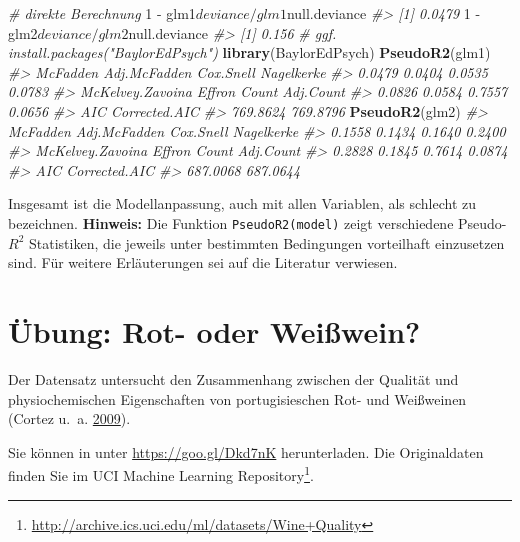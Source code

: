 \documentclass[12pt,ngerman,]{book}
\makeatletter
\newenvironment{Shaded}{\begin{snugshade}}{\end{snugshade}}
\newcommand{\KeywordTok}[1]{\textcolor[rgb]{0.13,0.29,0.53}{\textbf{{#1}}}}
\newcommand{\DecValTok}[1]{\textcolor[rgb]{0.00,0.00,0.81}{{#1}}}
\newcommand{\StringTok}[1]{\textcolor[rgb]{0.31,0.60,0.02}{{#1}}}
\newcommand{\CommentTok}[1]{\textcolor[rgb]{0.56,0.35,0.01}{\textit{{#1}}}}
\newcommand{\NormalTok}[1]{{#1}}
\let\rmarkdownfootnote\footnote%
\def\footnote{\protect\rmarkdownfootnote}
\newenvironment{kframe}{%
\medskip{}
\setlength{\fboxsep}{.8em}
 \def\at@end@of@kframe{}%
 \ifinner\ifhmode%
  \def\at@end@of@kframe{\end{minipage}}%
  \begin{minipage}{\columnwidth}%
 \fi\fi%
 \def\FrameCommand##1{\hskip\@totalleftmargin \hskip-\fboxsep
 \colorbox{shadecolor}{##1}\hskip-\fboxsep
     \hskip-\linewidth \hskip-\@totalleftmargin \hskip\columnwidth}%
 \MakeFramed {\advance\hsize-\width
   \@totalleftmargin\z@ \linewidth\hsize
   \@setminipage}}%
 {\par\unskip\endMakeFramed%
 \at@end@of@kframe}
\renewenvironment{Shaded}{\begin{kframe}}{\end{kframe}}
\makeatother
\begin{document}
\begin{Shaded}
\begin{Highlighting}[]
\CommentTok{# direkte Berechnung}
\DecValTok{1} \NormalTok{-}\StringTok{ }\NormalTok{glm1$deviance/glm1$null.deviance}
\CommentTok{#> [1] 0.0479}
\DecValTok{1} \NormalTok{-}\StringTok{ }\NormalTok{glm2$deviance/glm2$null.deviance}
\CommentTok{#> [1] 0.156}
\CommentTok{# ggf. install.packages("BaylorEdPsych")}
\KeywordTok{library}\NormalTok{(BaylorEdPsych)}
\KeywordTok{PseudoR2}\NormalTok{(glm1)}
\CommentTok{#>         McFadden     Adj.McFadden        Cox.Snell       Nagelkerke }
\CommentTok{#>           0.0479           0.0404           0.0535           0.0783 }
\CommentTok{#> McKelvey.Zavoina           Effron            Count        Adj.Count }
\CommentTok{#>           0.0826           0.0584           0.7557           0.0656 }
\CommentTok{#>              AIC    Corrected.AIC }
\CommentTok{#>         769.8624         769.8796}
\KeywordTok{PseudoR2}\NormalTok{(glm2)}
\CommentTok{#>         McFadden     Adj.McFadden        Cox.Snell       Nagelkerke }
\CommentTok{#>           0.1558           0.1434           0.1640           0.2400 }
\CommentTok{#> McKelvey.Zavoina           Effron            Count        Adj.Count }
\CommentTok{#>           0.2828           0.1845           0.7614           0.0874 }
\CommentTok{#>              AIC    Corrected.AIC }
\CommentTok{#>         687.0068         687.0644}
\end{Highlighting}
\end{Shaded}

Insgesamt ist die Modellanpassung, auch mit allen Variablen, als
schlecht zu bezeichnen. \textbf{Hinweis:} Die Funktion
\texttt{PseudoR2(model)} zeigt verschiedene Pseudo-\(R^2\) Statistiken,
die jeweils unter bestimmten Bedingungen vorteilhaft einzusetzen sind.
Für weitere Erläuterungen sei auf die Literatur verwiesen.

\section{Übung: Rot- oder Weißwein?}\label{ubung-rot--oder-weiwein}

Der Datensatz untersucht den Zusammenhang zwischen der Qualität und
physiochemischen Eigenschaften von portugisieschen Rot- und Weißweinen
(Cortez u.~a. \protect\hyperlink{ref-cortez2009modeling}{2009}).

Sie können in unter \url{https://goo.gl/Dkd7nK} herunterladen. Die
Originaldaten finden Sie im UCI Machine Learning Repository\footnote{\url{http://archive.ics.uci.edu/ml/datasets/Wine+Quality}}.
\end{document}
